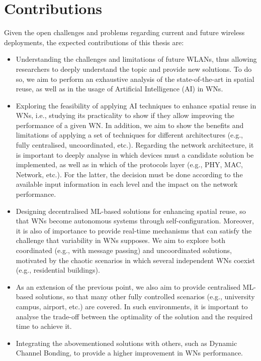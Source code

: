 \documentclass[12pt, a4paper,twoside]{tesi_upf}
\begin{document}
		\section{Contributions}
		\label{section:contributions}
			Given the open challenges and problems regarding current and future wireless deployments, the expected contributions of this thesis are:	
			\begin{itemize}
				\item Understanding the challenges and limitations of future WLANs, thus allowing researchers to deeply understand the topic and provide new solutions. To do so, we aim to perform an exhaustive analysis of the state-of-the-art in spatial reuse, as well as in the usage of Artificial Intelligence (AI) in WNs.  			
				\item Exploring the feasibility of applying AI techniques to enhance spatial reuse in WNs, i.e., studying its practicality to show if they allow improving the performance of a given WN. In addition, we aim to show the benefits and limitations of applying a set of techniques for different architectures (e.g., fully centralised, uncoordinated, etc.). Regarding the network architecture, it is important to deeply analyse in which devices must a candidate solution be implemented, as well as in which of the protocols layer (e.g., PHY, MAC, Network, etc.). For the latter, the decision must be done according to the available input information in each level and the impact on the network performance.					
				\item Designing decentralised ML-based solutions for enhancing spatial reuse, so that WNs become autonomous systems through self-configuration. Moreover, it is also of importance to provide real-time mechanisms that can satisfy the challenge that variability in WNs supposes. We aim to explore both coordinated (e.g., with message passing) and uncoordinated solutions, motivated by the chaotic scenarios in which several independent WNs coexist (e.g., residential buildings).
				\item As an extension of the previous point, we also aim to provide centralised ML-based solutions, so that many other fully controlled scenarios (e.g., university campus, airport, etc.) are covered. In such environments, it is important to analyse the trade-off between the optimality of the solution and the required time to achieve it.
				\item Integrating the abovementioned solutions with others, such as Dynamic Channel Bonding, to provide a higher improvement in WNs performance.
			\end{itemize}		
			
\end{document}
